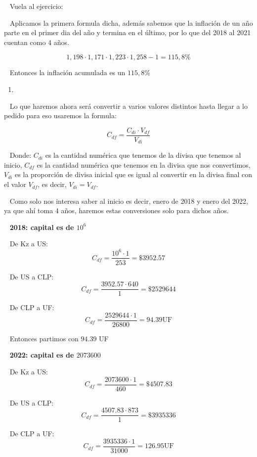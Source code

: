 \documentclass[
  letterpaper,
  DIV=11,
  numbers=noendperiod]{scrreport}
\providecommand{\tightlist}{%
  \setlength{\itemsep}{0pt}\setlength{\parskip}{0pt}}\usepackage{longtable,booktabs,array}
\begin{document}
\hfill\break

~ Vuela al ejercicio:

\hfill\break

~ Aplicamos la primera formula dicha, además sabemos que la inflación de
un año parte en el primer dia del año y termina en el último, por lo que
del 2018 al 2021 cuentan como 4 años.

\[
1,198\cdot 1,171 \cdot 1,223 \cdot 1,258 - 1 = 115,8\% 
\]

~ Entonces la inflación acumulada es un \(115,8\%\)

\hfill\break

\begin{enumerate}
\def\labelenumi{\arabic{enumi})}
\setcounter{enumi}{2}
\tightlist
\item
\end{enumerate}

\hfill\break

~ Lo que haremos ahora será convertir a varios valores distintos hasta
llegar a lo pedido para eso usaremos la formula:

\[
C_{df}=\frac{C_{di}\cdot V_{df}}{V_{di}}
\]

~ Donde: \(C_{di}\) es la cantidad numérica que tenemos de la divisa que
tenemos al inicio, \(C_{df}\) es la cantidad numérica que tenemos en la
divisa que nos convertimos, \(V_{di}\) es la proporción de divisa
inicial que es igual al convertir en la divisa final con el valor
\(V_{df}\), es decir, \(V_{di}=V_{df}\).

~ Como solo nos interesa saber al inicio es decir, enero de 2018 y enero
del 2022, ya que ahí toma 4 años, haremos estas conversiones solo para
dichos años.

~ \textbf{2018: capital es de \(10^6\)}

~ De Kz a US: \[
C_{df}=\frac{10^6\cdot 1}{253}=\$3952.57
\]

~ De US a CLP: \[
C_{df}=\frac{3952.57\cdot 640}{1}=\$2529644
\]

~ De CLP a UF: \[
C_{df}=\frac{2529644\cdot 1}{26800}=94.39\text{UF}
\]

~ Entonces partimos con \(94.39\) UF

~ \textbf{2022: capital es de \(2073600\)}

~ De Kz a US: \[
C_{df}=\frac{2073600\cdot 1}{460}=\$4507.83
\]

~ De US a CLP: \[
C_{df}=\frac{4507.83\cdot 873}{1}=\$3935336
\]

~ De CLP a UF: \[
C_{df}=\frac{3935336\cdot 1}{31000}=126.95\text{UF}
\]
\end{document}
